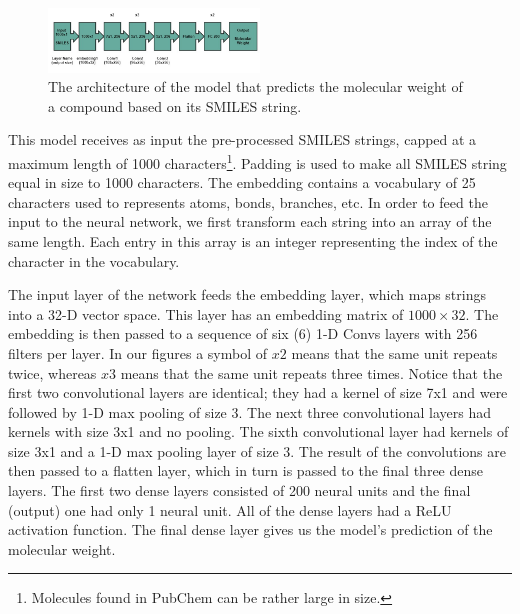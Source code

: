         \begin{figure}[htbp]
        \centering
        \includegraphics[width=0.5\textwidth]{figures/MW-model_arquitecture.jpg}
        \caption{The architecture of the model that predicts the molecular weight of a compound based on its SMILES string.}
        \label{fig:mw-architecture}
    \end{figure}
    This model  receives as input the pre-processed SMILES strings, capped at a maximum length of 1000 characters\footnote{Molecules found in PubChem can be rather large in size.}. Padding is used to make all SMILES string equal in size to 1000 characters. The embedding contains a vocabulary of 25 characters used to represents atoms, bonds, branches, etc. In order to feed the input to the neural network, we first transform each string into an array of the same length. Each entry 
    in this array is an integer representing the index of the character in the vocabulary. 
    
    The input layer of the network feeds the embedding layer, which maps strings into a  32-D vector space. This layer has an embedding matrix 
    of  $1000 \times 32$. The embedding is then passed to a sequence of six (6)  1-D Convs layers with 256 filters per layer. 
    In  our figures a symbol of $x2$ means that the same unit repeats twice, whereas $x3$ means that the same unit repeats three times. 
Notice that the first two convolutional layers are identical; they had a kernel of size 7x1 and were followed by 1-D max pooling of size 3.
The next three convolutional  layers had  kernels with size 3x1 and no pooling. The sixth convolutional layer had kernels of size 3x1 
and a 1-D max pooling layer of size 3. The result of the convolutions are then passed to a flatten layer, which in turn is passed to the final three dense layers. The first two dense layers consisted of 200 neural units and the final (output) one had only 1 neural unit. All of the dense layers had a ReLU activation function. The final  dense layer gives us the model's prediction of the molecular weight.

